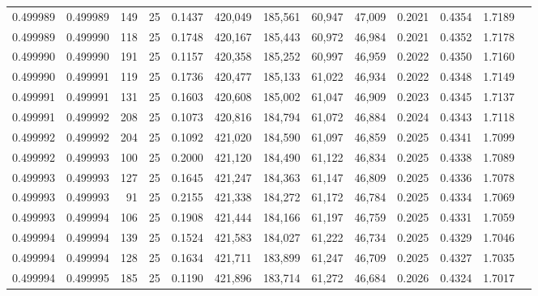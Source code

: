 \begin{tabular}{rrrrrrrrrrrrr}
0.499989 & 0.499989 & 149 &  25 &                                     0.1437 & 420,049 & 185,561 &  60,947 &  47,009 & 0.2021 & 0.4354 & 1.7189 \\
0.499989 & 0.499990 & 118 &  25 &                                     0.1748 & 420,167 & 185,443 &  60,972 &  46,984 & 0.2021 & 0.4352 & 1.7178 \\
0.499990 & 0.499990 & 191 &  25 &                                     0.1157 & 420,358 & 185,252 &  60,997 &  46,959 & 0.2022 & 0.4350 & 1.7160 \\
0.499990 & 0.499991 & 119 &  25 &                                     0.1736 & 420,477 & 185,133 &  61,022 &  46,934 & 0.2022 & 0.4348 & 1.7149 \\
0.499991 & 0.499991 & 131 &  25 &                                     0.1603 & 420,608 & 185,002 &  61,047 &  46,909 & 0.2023 & 0.4345 & 1.7137 \\
0.499991 & 0.499992 & 208 &  25 &                                     0.1073 & 420,816 & 184,794 &  61,072 &  46,884 & 0.2024 & 0.4343 & 1.7118 \\
0.499992 & 0.499992 & 204 &  25 &                                     0.1092 & 421,020 & 184,590 &  61,097 &  46,859 & 0.2025 & 0.4341 & 1.7099 \\
0.499992 & 0.499993 & 100 &  25 &                                     0.2000 & 421,120 & 184,490 &  61,122 &  46,834 & 0.2025 & 0.4338 & 1.7089 \\
0.499993 & 0.499993 & 127 &  25 &                                     0.1645 & 421,247 & 184,363 &  61,147 &  46,809 & 0.2025 & 0.4336 & 1.7078 \\
0.499993 & 0.499993 &  91 &  25 &                                     0.2155 & 421,338 & 184,272 &  61,172 &  46,784 & 0.2025 & 0.4334 & 1.7069 \\
0.499993 & 0.499994 & 106 &  25 &                                     0.1908 & 421,444 & 184,166 &  61,197 &  46,759 & 0.2025 & 0.4331 & 1.7059 \\
0.499994 & 0.499994 & 139 &  25 &                                     0.1524 & 421,583 & 184,027 &  61,222 &  46,734 & 0.2025 & 0.4329 & 1.7046 \\
0.499994 & 0.499994 & 128 &  25 &                                     0.1634 & 421,711 & 183,899 &  61,247 &  46,709 & 0.2025 & 0.4327 & 1.7035 \\
0.499994 & 0.499995 & 185 &  25 &                                     0.1190 & 421,896 & 183,714 &  61,272 &  46,684 & 0.2026 & 0.4324 & 1.7017 \\

\end{tabular}
